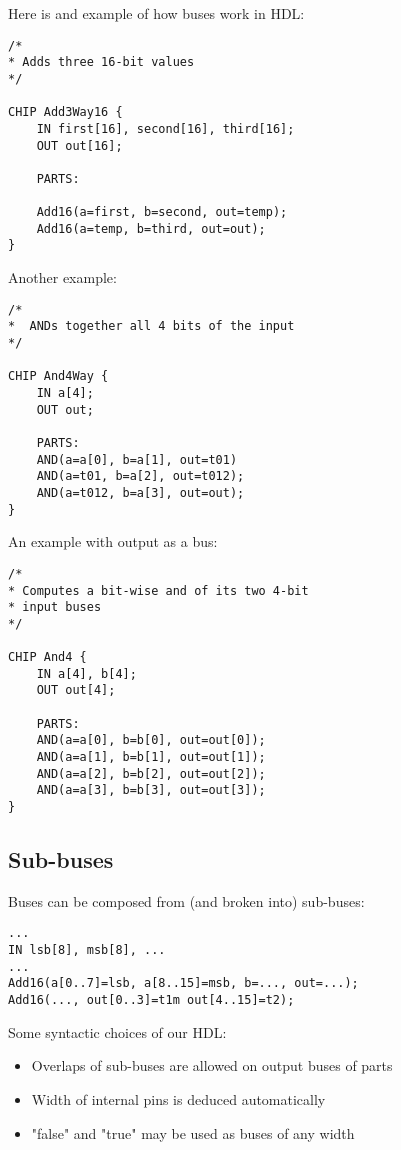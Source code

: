 Here is and example of how buses work in HDL:

\begin{lstlisting}
/*
* Adds three 16-bit values
*/

CHIP Add3Way16 {
    IN first[16], second[16], third[16];
    OUT out[16];

    PARTS:

    Add16(a=first, b=second, out=temp);
    Add16(a=temp, b=third, out=out);
}
\end{lstlisting}

Another example:

\begin{lstlisting}
/*
*  ANDs together all 4 bits of the input
*/

CHIP And4Way {
    IN a[4];
    OUT out;

    PARTS:
    AND(a=a[0], b=a[1], out=t01)
    AND(a=t01, b=a[2], out=t012);
    AND(a=t012, b=a[3], out=out);
}
\end{lstlisting}

An example with output as a bus:

\begin{lstlisting}
/*
* Computes a bit-wise and of its two 4-bit
* input buses
*/

CHIP And4 {
    IN a[4], b[4];
    OUT out[4];

    PARTS:
    AND(a=a[0], b=b[0], out=out[0]);
    AND(a=a[1], b=b[1], out=out[1]);
    AND(a=a[2], b=b[2], out=out[2]);
    AND(a=a[3], b=b[3], out=out[3]);
}
\end{lstlisting}

\subsection{Sub-buses}

Buses can be composed from (and broken into) sub-buses:

\begin{lstlisting}
...
IN lsb[8], msb[8], ...
...
Add16(a[0..7]=lsb, a[8..15]=msb, b=..., out=...);
Add16(..., out[0..3]=t1m out[4..15]=t2);
\end{lstlisting}

Some syntactic choices of our HDL:

\begin{itemize}
    \item Overlaps of sub-buses are allowed on output buses of parts
    \item Width of internal pins is deduced automatically
    \item "false" and "true" may be used as buses of any width
\end{itemize}
